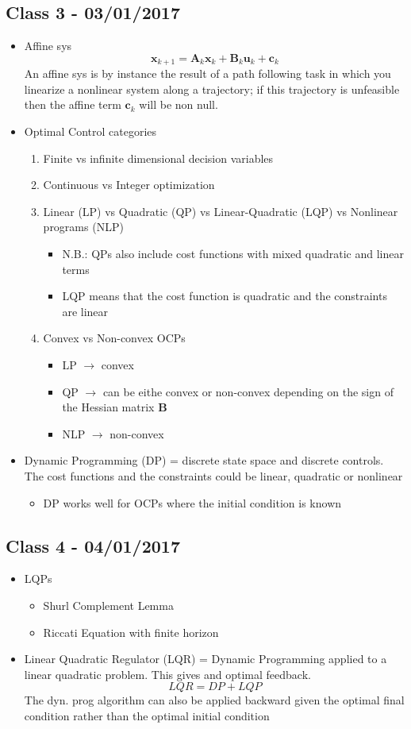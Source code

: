 \subsection*{Class 3 - 03/01/2017}
\begin{itemize}
\item Affine sys
$$ \mathbf{x}_{k+1} = \mathbf{A}_k \mathbf{x}_k + \mathbf{B}_k \mathbf{u}_k + \mathbf{c}_k$$
An affine sys is by instance the result of a path following task in which you linearize a nonlinear system along a trajectory; if this trajectory is unfeasible then the affine term $\mathbf{c}_k$ will be non null.
\item Optimal Control categories
\begin{enumerate}
\item Finite vs infinite dimensional decision variables
\item Continuous vs Integer optimization
\item Linear (LP) vs Quadratic (QP) vs Linear-Quadratic (LQP) vs Nonlinear programs (NLP)
\begin{itemize}
\item N.B.: QPs also include cost functions with mixed quadratic and linear terms
\item LQP means that the cost function is quadratic and the constraints are linear
\end{itemize}
\item Convex vs Non-convex OCPs
\begin{itemize}
\item LP $\rightarrow$ convex
\item QP $\rightarrow$ can be eithe convex or non-convex depending on the sign of the Hessian matrix $\mathbf{B}$
\item NLP $\rightarrow$ non-convex
\end{itemize}
\end{enumerate}
\item Dynamic Programming (DP) = discrete state space and discrete controls. The cost functions and the constraints could be linear, quadratic or nonlinear
\begin{itemize}
\item DP works well for OCPs where the initial condition is known
\end{itemize}
\end{itemize}
\subsection*{Class 4 - 04/01/2017}
\begin{itemize}
\item LQPs
\begin{itemize}
\item Shurl Complement Lemma
\item Riccati Equation with finite horizon
\end{itemize}
\item Linear Quadratic Regulator (LQR) = Dynamic Programming applied to a linear quadratic problem. This gives and optimal feedback.
$$LQR = DP + LQP$$
The dyn. prog algorithm can also be applied backward given the optimal final condition rather than the optimal initial condition
\end{itemize}

